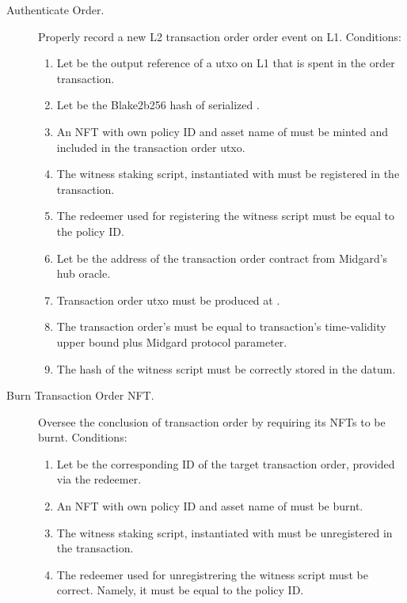 \documentclass[../midgard.tex]{subfiles}
\begin{document}
\begin{description}
  \item[Authenticate Order.] Properly record a new L2 transaction order order event on L1.
    Conditions:
      \begin{enumerate}
        \item Let  be the output reference of a utxo on L1 that is spent in the order transaction.
        \item Let  be the Blake2b256 hash of serialized .
        \item An NFT with own policy ID and asset name of  must be minted and included in the transaction order utxo.
        \item The witness staking script, instantiated with  must be registered in the transaction.
        \item The redeemer used for registering the witness script must be equal to the  policy ID.
        \item Let  be the address of the transaction order contract from Midgard's hub oracle.
        \item Transaction order utxo must be produced at .
        \item The transaction order's  must be equal to transaction's time-validity upper bound plus  Midgard protocol parameter.
        \item The hash of the witness script must be correctly stored in the datum.
      \end{enumerate}
    \item[Burn Transaction Order NFT.] Oversee the conclusion of transaction order by requiring its NFTs to be burnt.
    Conditions:
      \begin{enumerate}
        \item Let  be the corresponding ID of the target transaction order, provided via the redeemer.
        \item An NFT with own policy ID and asset name of  must be burnt.
        \item The witness staking script, instantiated with  must be unregistered in the transaction.
        \item The redeemer used for unregistrering the witness script must be correct.
          Namely, it must be equal to the  policy ID.
      \end{enumerate}
\end{description}
\end{document}
